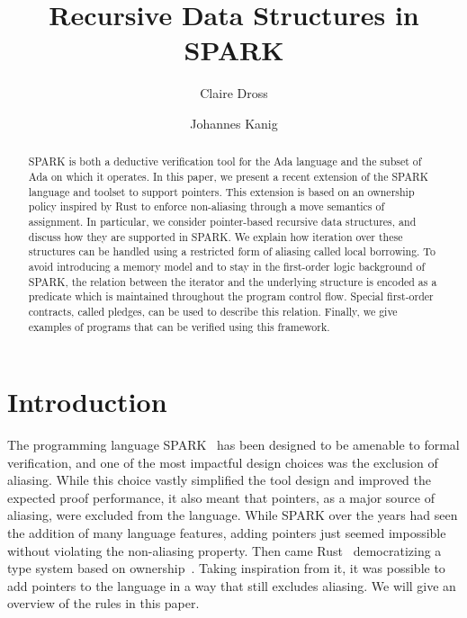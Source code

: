 \documentclass[runningheads]{llncs}
\begin{document}
%
\title{Recursive Data Structures in SPARK}
%
\author{Claire Dross \and Johannes Kanig}
%
%
%
\maketitle              %
%
\begin{abstract}
SPARK is both a deductive verification tool for the Ada language and the subset of Ada on which it operates. In this paper, we present a recent extension of the SPARK language and toolset to support pointers. This extension is based on an ownership policy inspired by Rust to enforce non-aliasing through a move semantics of assignment. In particular, we consider pointer-based recursive data structures, and discuss how they are supported in SPARK. We explain how iteration over these structures can be handled using a restricted form of aliasing called local borrowing. To avoid introducing a memory model and to stay in the first-order logic background of SPARK, the relation between the iterator and the underlying structure is encoded as a predicate which is maintained throughout the program control flow. Special first-order contracts, called pledges, can be used to describe this relation. Finally, we give examples of programs that can be verified using this framework.

\end{abstract}
%
%
%
\section{Introduction}
The programming language SPARK~\cite{spark} has been designed to be amenable to formal verification, and one of the most impactful design choices was the exclusion of aliasing. While this choice vastly simplified the tool design and improved the expected proof performance, it also meant that pointers, as a major source of aliasing, were excluded from the language. While SPARK over the years had seen the addition of many language features, adding pointers just seemed impossible without violating the non-aliasing property. %
Then came Rust~\cite{rust} democratizing a type system based on ownership~\cite{clarke1998ownership}. %
Taking inspiration from it, it was possible to add pointers to the language in a way that still excludes aliasing.
We will give an overview of the rules in this paper.
\end{document}
